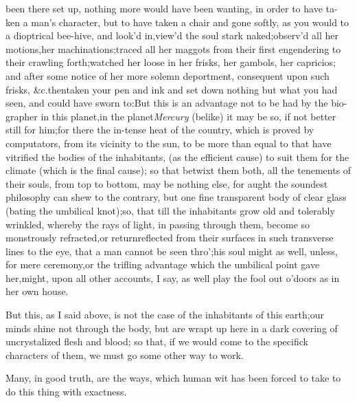 \documentclass{article}
\begin{document}
\noindent
{}
been there set up,
nothing more would have been wanting, in order to have ta- ken a
man’s character, but to have taken a chair and gone softly,
as you would to a dioptrical bee-hive, and look’d
in,\tsk\break view’d the soul stark naked;\tsk  observ’d all her
motions,\tsk  her machinations;\tsk\break  traced all her maggots from
their first engendering to their crawling forth;\tsk\break  watched her
loose in her frisks, her gambols, her capricios; and after some
notice of her more solemn deportment, consequent upon such frisks,
\&c.\tsh  then\break taken your pen and ink and set down
nothing but what you had seen, and\break
could have sworn to:\tsk  But this is an\break
advantage not to be had by the bio-\break
grapher in this
planet,\tsk  in the planet\break \textit{Mercury} (belike) it may be so, if not\break
better still for him;\tsh  for there the in-\break tense heat of the country, which is
pro\-ved by computators,
from its vicinity to the sun, to be more than equal to that
have vitrified the
bodies of the inhabitants, (as the efficient cause) to suit them
for the climate (which is the final cause); so that betwixt them
both, all the tenements of their souls, from top to bottom, may
be nothing else, for aught the soundest philosophy can shew to
the contrary, but one fine transparent body of clear glass
(bating the umbilical knot);\tsk\break  so, that till the inhabitants
grow old and tolerably wrinkled, whereby the rays of light, in
passing through them, become so monstrously refracted,\tsh  or
return\break reflected from their surfaces in such\break
transverse lines to
the eye, that a man cannot be seen thro’;\tsk  his soul might
as well, unless, for mere ceremony,\tsk or the trifling advantage
which the umbilical point gave her,\tsk  might, upon all other
accounts, I say, as well play the fool out o’doors as in her own
house.

But this, as I said above, is not the case of the inhabitants of
this earth;\tsk  our minds shine not through the body, but are wrapt
up here in a dark covering of uncrystalized flesh and blood; so
that, if we would come to the specifick characters of them, we must
go some other way to work.

Many, in good truth, are the ways, which human wit has been
forced to take to do this thing with exactness.
\end{document}
